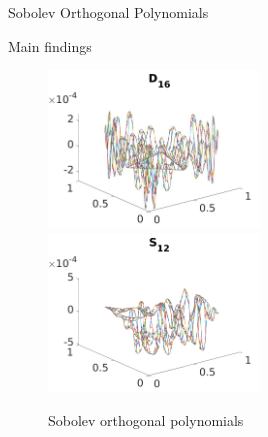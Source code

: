 \documentclass[xcolor = dvipsnames]{beamer}
\begin{document}
\begin{section}{Sobolev Orthogonal Polynomials}
\begin{frame}{Main findings}
    \begin{figure}
        \centering
        \includegraphics[width=0.5\textwidth]{images/H1SymmOPs0_19/Ss16.jpg}
        \includegraphics[width=0.5\textwidth]{images/H1AntisymOPs0_23/SAntiSym12.png}
        \caption{Sobolev orthogonal polynomials}
    \end{figure}
\end{frame}

\end{section}
\end{document}
